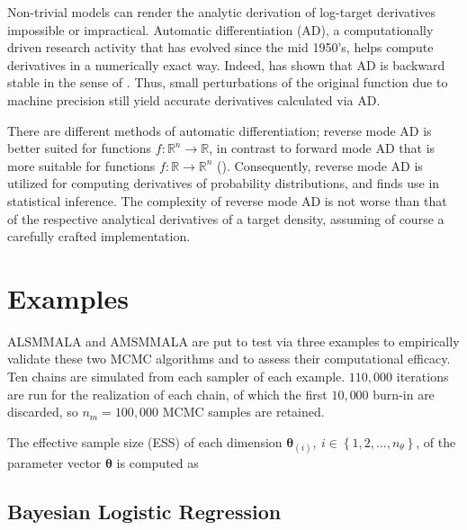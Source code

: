\documentclass[twoside,11pt]{article}
\begin{document}
Non-trivial models can render the analytic derivation of log-target derivatives impossible or impractical. Automatic
differentiation (AD), a computationally driven research activity that has evolved since the mid 1950's, helps compute 
derivatives in a numerically exact way. Indeed, \cite{gri__ona} has shown that AD is backward stable in the sense of 
\cite{wil__mod}. Thus, small perturbations of the original function due to machine precision still yield accurate 
derivatives calculated via AD.

There are different methods of automatic differentiation; reverse mode AD is better suited for functions
$f:\mathbb{R}^n\rightarrow\mathbb{R}$, in contrast to forward mode AD that is more suitable for functions 
$f:\mathbb{R}\rightarrow\mathbb{R}^n$ (\cite{gri_wal__eva}). Consequently, reverse mode AD is utilized for computing 
derivatives of probability distributions, and finds use in statistical inference. The complexity of reverse mode AD is not
worse than that of the respective analytical derivatives of a target density, assuming of course a carefully crafted
implementation.

\section{Examples}
\label{Examples}

ALSMMALA and AMSMMALA are put to test via three examples to empirically validate these two MCMC algorithms and to assess 
their computational efficacy. Ten chains are simulated from each sampler of each example. $110,000$ iterations are run for 
the realization of each chain, of which the first $10,000$ burn-in are discarded, so $n_m=100,000$ MCMC samples are retained.

The effective sample size (ESS) of each dimension $\boldsymbol{\theta}_{(i)},~i\in\left\{1,2,\dots,n_{\theta}\right\}$,
of the parameter vector $\boldsymbol{\theta}$ is computed as

\newpage
\subsection{Bayesian Logistic Regression}
\end{document}
